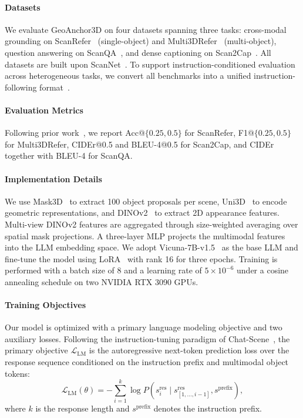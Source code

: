 \documentclass[lettersize,journal]{IEEEtran}
\begin{document}
\paragraph*{Datasets} We evaluate GeoAnchor3D on four datasets spanning three tasks: cross-modal grounding on ScanRefer~\cite{scanrefer2020} (single-object) and Multi3DRefer~\cite{multi3drefer2023} (multi-object), question answering on ScanQA~\cite{scanqa2022}, and dense captioning on Scan2Cap~\cite{scan2cap2021}. All datasets are built upon ScanNet~\cite{scannet2017}. To support instruction-conditioned evaluation across heterogeneous tasks, we convert all benchmarks into a unified instruction-following format~\cite{chatscene2024}.

\paragraph*{Evaluation Metrics} Following prior work~\cite{chatscene2024}, we report Acc@$\{0.25, 0.5\}$ for ScanRefer, F1@$\{0.25, 0.5\}$ for Multi3DRefer, CIDEr@0.5 and BLEU-4@0.5 for Scan2Cap, and CIDEr together with BLEU-4 for ScanQA.

\paragraph*{Implementation Details} We use Mask3D~\cite{mask3d2023} to extract 100 object proposals per scene, Uni3D~\cite{uni3d2024} to encode geometric representations, and DINOv2~\cite{dinov22023} to extract 2D appearance features. Multi-view DINOv2 features are aggregated through size-weighted averaging over spatial mask projections. A three-layer MLP projects the multimodal features into the LLM embedding space. We adopt Vicuna-7B-v1.5~\cite{vicuna2023} as the base LLM and fine-tune the model using LoRA~\cite{lora2022} with rank 16 for three epochs. Training is performed with a batch size of 8 and a learning rate of $5 \times 10^{-6}$ under a cosine annealing schedule on two NVIDIA RTX 3090 GPUs.


\paragraph*{Training Objectives}
Our model is optimized with a primary language modeling objective and two auxiliary losses. Following the instruction-tuning paradigm of Chat-Scene~\cite{chatscene2024}, the primary objective $\mathcal{L}_{\text{LM}}$ is the autoregressive next-token prediction loss over the response sequence conditioned on the instruction prefix and multimodal object tokens:
\begin{equation}
\mathcal{L}_{\text{LM}}(\theta) = -\sum_{i=1}^{k} \log P\left(s_i^{\text{res}} \mid s_{[1,\dots,i-1]}^{\text{res}}, s^{\text{prefix}}\right),
\end{equation}
where $k$ is the response length and $s^{\text{prefix}}$ denotes the instruction prefix.
\end{document}
